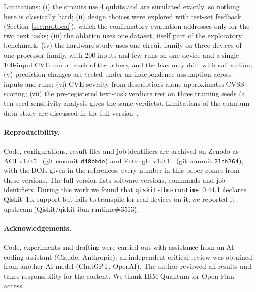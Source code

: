 \documentclass[11pt]{article}
\begin{document}
Limitations: (i) the circuits use 4 qubits and are simulated exactly, so nothing here is classically hard; (ii) design choices were explored with test-set feedback (Section~\ref{sec:protocol}), which the confirmatory evaluation addresses only for the two text tasks; (iii) the ablation uses one dataset, itself part of the exploratory benchmark; (iv) the hardware study uses one circuit family on three devices of one processor family, with 200 inputs and few runs on one device and a single 100-input CVE run on each of the others, and the bias may drift with calibration; (v) prediction changes are tested under an independence assumption across inputs and runs; (vi) CVE severity from descriptions alone approximates CVSS scoring; (vii) the pre-registered text-task verdicts rest on three training seeds (a ten-seed sensitivity analysis gives the same verdicts). Limitations of the quantum-data study are discussed in the full version~\cite{reddy2026full}.

\paragraph{Reproducibility.} Code, configurations, result files and job identifiers are archived on Zenodo as AGI v1.0.5~\cite{reddy2026agi} (git commit \texttt{d48ebde}) and Entangle v1.0.1~\cite{reddy2026entangle} (git commit \texttt{21ab264}), with the DOIs given in the references; every number in this paper comes from these versions. The full version lists software versions, commands and job identifiers. During this work we found that \texttt{qiskit-ibm-runtime}~0.44.1 declares Qiskit~1.x support but fails to transpile for real devices on it; we reported it upstream (Qiskit/qiskit-ibm-runtime\#3563).

\paragraph{Acknowledgements.} Code, experiments and drafting were carried out with assistance from an AI coding assistant (Claude, Anthropic); an independent critical review was obtained from another AI model (ChatGPT, OpenAI). The author reviewed all results and takes responsibility for the content. We thank IBM Quantum for Open Plan access.



\end{document}
